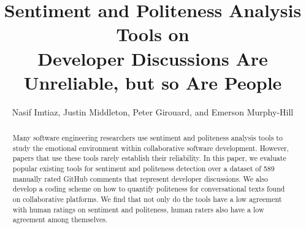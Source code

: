 \documentclass[sigconf]{acmart}
\begin{document}
\title{Sentiment and Politeness Analysis Tools on\\Developer Discussions Are Unreliable, but so Are People}

\author{Nasif Imtiaz, Justin Middleton, Peter Girouard, and Emerson Murphy-Hill }

\begin{abstract}
Many software engineering researchers use sentiment and politeness analysis tools to study the emotional environment within collaborative software development. 
However, papers that use these tools rarely establish their reliability.
In this paper, we evaluate popular existing tools for sentiment and politeness detection over a dataset of 589 manually rated GitHub comments that represent developer discussions. 
We also develop a coding scheme on how to quantify politeness for conversational texts found on collaborative platforms. 
We find that not only do the tools have a low agreement with human ratings on sentiment and politeness, human raters also have a low agreement among themselves. 
\end{abstract}
\end{document}
